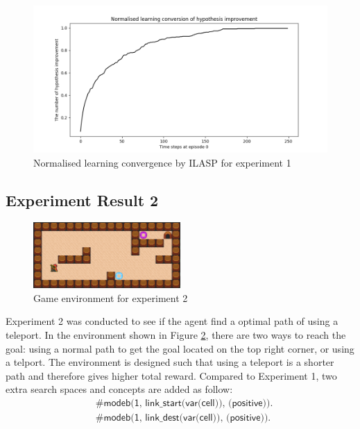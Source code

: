 \begin{figure}[!htb]
\centering
\includegraphics[width=1.0\textwidth]{./figures/experiment1_ilasp}
\caption{Normalised learning convergence by ILASP for experiment 1}
\label{experiment1_ilasp}
\end{figure}

\newpage
\subsection{Experiment Result 2}
\label{subsec:experiment_result_2}

\begin{figure}[!htb]
\centering
\includegraphics[width=0.5\textwidth]{./figures/experiment2}
\caption{Game environment for experiment 2}
\label{experiment3}
\end{figure}

Experiment 2 was conducted to see if the agent find a optimal path of using a teleport. In the environment shown in Figure \ref{experiment3},
there are two ways to reach the goal: using a normal path to get the goal located on the top right corner, or using a telport.
The environment is designed such that using a teleport is a shorter path and therefore gives higher total reward.
Compared to Experiment 1, two extra search spaces and concepts are added as follow:
\begin{equation*}
\begin{split}
&\textsf{\#modeb(1, link\_start(var(cell)), (positive)).}\\
&\textsf{\#modeb(1, link\_dest(var(cell)), (positive)).}
\end{split}
\end{equation*}

